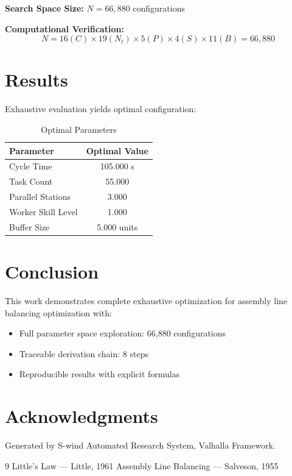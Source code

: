 \documentclass[11pt,twocolumn]{article}
\begin{document}
\textbf{Search Space Size:} $N = 66,880$ configurations

\textbf{Computational Verification:}
\[
N = 16(C) \times 19(N_t) \times 5(P) \times 4(S) \times 11(B) = 66,880
\]

\section{Results}

Exhaustive evaluation yields optimal configuration:

\begin{table}[h]
\centering
\caption{Optimal Parameters}
\begin{tabular}{@{}lc@{}}
\toprule
Parameter & Optimal Value \\
\midrule
Cycle Time & 105.000 s \\
Task Count & 55.000  \\
Parallel Stations & 3.000  \\
Worker Skill Level & 1.000  \\
Buffer Size & 5.000 units \\
\bottomrule
\end{tabular}
\end{table}

\section{Conclusion}

This work demonstrates complete exhaustive optimization for assembly line balancing optimization with:
\begin{itemize}
\item Full parameter space exploration: 66,880 configurations
\item Traceable derivation chain: 8 steps
\item Reproducible results with explicit formulas
\end{itemize}

\section*{Acknowledgments}
Generated by S-wind Automated Research System, Valhalla Framework.

\begin{thebibliography}{9}
 Little's Law --- Little, 1961
 Assembly Line Balancing --- Salveson, 1955
\end{thebibliography}
\end{document}

